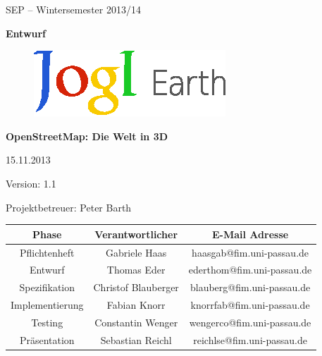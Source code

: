 \documentclass[10pt]{scrreprt}
\begin{document}
\begin{center}
\vspace{2.0 cm}
{\LARGE SEP – Wintersemester 2013/14}

\vspace{1.0 cm}
\textbf{{\Huge Entwurf}}

\vspace{0.8 cm}
\begin{figure}[!htb]
\begin{center}
	\includegraphics[scale=1.5]{Logo-Print.eps}
\end{center}
\end{figure}

\vspace{0.2 cm}
\textbf{{\huge OpenStreetMap: Die Welt in 3D}}

\vspace{1.5 cm}
15.11.2013

\vspace{0.5 cm}
Version: 1.1

\vspace{1.5 cm}
{\Large Projektbetreuer: Peter Barth}

\vspace{1.5 cm}
\begin{tabular}{|c|c|c|}
\hline 
\rule[-1ex]{0pt}{4ex} \textbf{Phase} & \textbf{Verantwortlicher} & \textbf{E-Mail Adresse} \\ 
\hline  \hline
\rule[-1ex]{0pt}{4ex} Pflichtenheft & Gabriele Haas & haasgab@fim.uni-passau.de \\ 
\hline  \hline
\rule[-1ex]{0pt}{4ex} Entwurf & Thomas Eder & ederthom@fim.uni-passau.de \\ 
\hline  \hline
\rule[-1ex]{0pt}{4ex} Spezifikation & Christof Blauberger & blauberg@fim.uni-passau.de \\ 
\hline  \hline
\rule[-1ex]{0pt}{4ex} Implementierung & Fabian Knorr & knorrfab@fim.uni-passau.de \\ 
\hline \hline 
\rule[-1ex]{0pt}{4ex} Testing & Constantin Wenger & wengerco@fim.uni-passau.de \\ 
\hline  \hline
\rule[-1ex]{0pt}{4ex} Präsentation & Sebastian Reichl & reichlse@fim.uni-passau.de \\ 
\hline 
\end{tabular}

\end{center}
\end{document}
